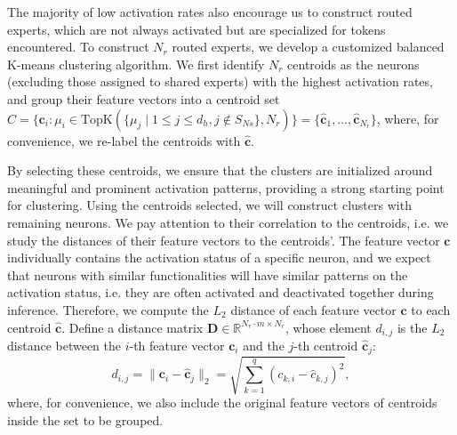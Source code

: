 The majority of low activation rates also encourage us to construct routed experts, which are not always activated but are specialized for tokens encountered.
To construct $N_r$ routed experts, we develop a customized balanced K-means clustering algorithm.
We first identify $N_r$ centroids as the neurons (excluding those assigned to shared experts) with the highest activation rates, and group their feature vectors into a centroid set $C = \{ \mathbf{c}_i: \mu_i \in \text{TopK}(\{ \mu_j \mid 1 \leq j \leq d_h, j\notin S_{Ns} \}, N_r)  \} = \{ \hat{\mathbf{c}}_1,\dots,\hat{\mathbf{c}}_{N_r} \}$, 
where, for convenience, we re-label the centroids with $\hat{\mathbf{c}}$.


By selecting these centroids, we ensure that the clusters are initialized around meaningful and prominent activation patterns, providing a strong starting point for clustering.
Using the centroids selected, we will construct clusters with remaining neurons.
We pay attention to their correlation to the centroids, i.e. we study the distances of their feature vectors to the centroids'.
The feature vector $\mathbf{c}$ individually contains the activation status of a specific neuron, and we expect that neurons with similar functionalities will have similar patterns on the activation status, i.e. they are often activated and deactivated together during inference.
Therefore, we compute the $L_2$ distance of each feature vector $\mathbf{c}$ to each centroid $\hat{\mathbf{c}}$.
Define a distance matrix $\mathbf{D} \in  \mathbb{R}^{ N_r\cdot m \times N_r}$, whose element $d_{i,j}$ is the $L_2$ distance between the $i$-th feature vector $\mathbf{c}_i$ and the $j$-th centroid $\hat{\mathbf{c}}_j$:
\begin{equation}
    d_{i,j} = \| \mathbf{c}_i - \hat{\mathbf{c}}_j \|_2 = \sqrt{\sum_{k=1}^q (c_{k,i} - \hat{c}_{k,j})^2},
\end{equation}
where, for convenience, we also include the original feature vectors of centroids inside the set to be grouped.

